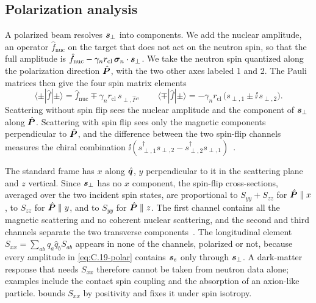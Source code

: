 \subsection{Polarization analysis}

A polarized beam resolves $\bm{s}_\perp$ into components. We add the nuclear amplitude, an operator $\hat f_{\mathrm{nuc}}$ on the target that does not act on the neutron spin, so that the full amplitude is $\hat f_{\mathrm{nuc}} - \gamma_nr_{\mathrm{cl}}\,\bm{\sigma}_n\cdot\bm{s}_\perp$. We take the neutron spin quantized along the polarization direction $\hat{\bm{P}}$, with the two other axes labeled 1 and 2. The Pauli matrices then give the four spin matrix elements
\begin{equation}
  \langle\pm|\hat f|\pm\rangle = \hat f_{\mathrm{nuc}} \mp \gamma_nr_{\mathrm{cl}}\,s_{\perp,\hat P}, \qquad
  \langle\mp|\hat f|\pm\rangle = -\gamma_nr_{\mathrm{cl}}\,\bigl(s_{\perp,1} \pm \ii\,s_{\perp,2}\bigr) .
  \label{eq:C.19-polar}
\end{equation}
Scattering without spin flip sees the nuclear amplitude and the component of $\bm{s}_\perp$ along $\hat{\bm{P}}$. Scattering with spin flip sees only the magnetic components perpendicular to $\hat{\bm{P}}$, and the difference between the two spin-flip channels measures the chiral combination $\ii(s_{\perp,1}^\dagger s_{\perp,2} - s_{\perp,2}^\dagger s_{\perp,1})$~\cite{blume1963polarization,moon1969polarization}.

The standard frame has $x$ along $\hat{\bm{q}}$, $y$ perpendicular to it in the scattering plane and $z$ vertical. Since $\bm{s}_\perp$ has no $x$ component, the spin-flip cross-sections, averaged over the two incident spin states, are proportional to $S_{yy} + S_{zz}$ for $\hat{\bm{P}} \parallel x$, to $S_{zz}$ for $\hat{\bm{P}} \parallel y$, and to $S_{yy}$ for $\hat{\bm{P}} \parallel z$. The first channel contains all the magnetic scattering and no coherent nuclear scattering, and the second and third channels separate the two transverse components~\cite{moon1969polarization}. The longitudinal element $S_{xx} = \sum_{ab}\hat q_a\hat q_bS_{ab}$ appears in none of the channels, polarized or not, because every amplitude in \cref{eq:C.19-polar} contains $\bm{s}_e$ only through $\bm{s}_\perp$. A dark-matter response that needs $S_{xx}$ therefore cannot be taken from neutron data alone; examples include the contact spin coupling and the absorption of an axion-like particle.  bounds $S_{xx}$ by positivity and fixes it under spin isotropy.
